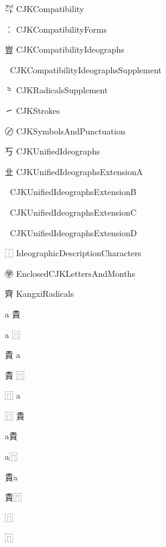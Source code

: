 \documentclass{minimal}
\begin{document}
㌀ CJKCompatibility\par
︰ CJKCompatibilityForms\par
豈 CJKCompatibilityIdeographs\par
丽 CJKCompatibilityIdeographsSupplement\par
⺀ CJKRadicalsSupplement\par
㇀ CJKStrokes\par
〄 CJKSymbolsAndPunctuation\par
丂 CJKUnifiedIdeographs\par
㐀 CJKUnifiedIdeographsExtensionA\par
𠀀 CJKUnifiedIdeographsExtensionB\par
𪜀 CJKUnifiedIdeographsExtensionC\par
𫝀 CJKUnifiedIdeographsExtensionD\par
⿰ IdeographicDescriptionCharacters\par
㊫ EnclosedCJKLettersAndMonths\par
⿑ KangxiRadicals\par

a 貴\par
a ⿵\par
貴 a\par
貴 ⿵\par
⿵ a\par
⿵ 貴\par

a貴\par
a⿵\par
貴a\par
貴⿵\par
⿵ \par
⿵ \par
\end{document}
